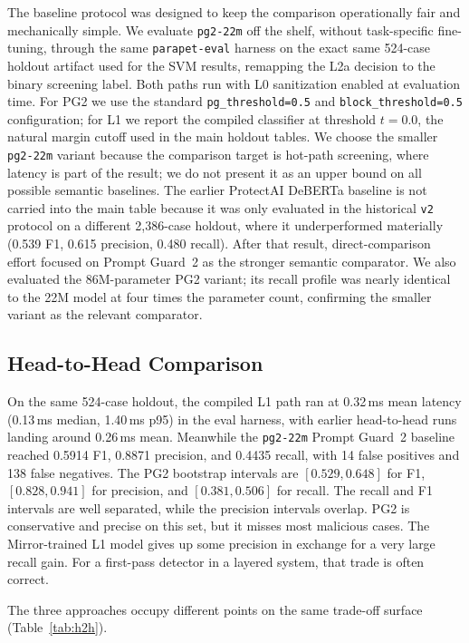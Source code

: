 \documentclass[11pt,a4paper]{article}
\begin{document}
The baseline protocol was designed to keep the comparison operationally
fair and mechanically simple. We evaluate \texttt{pg2-22m} off the
shelf, without task-specific fine-tuning, through the same
\texttt{parapet-eval} harness on the exact same 524-case holdout
artifact used for the SVM results, remapping the L2a decision to the
binary screening label. Both paths run with L0 sanitization enabled at
evaluation time. For PG2 we use the standard
\texttt{pg\_threshold=0.5} and \texttt{block\_threshold=0.5}
configuration; for L1 we report the compiled classifier at threshold
$t{=}0.0$, the natural margin cutoff used in the main holdout tables.
We choose the smaller \texttt{pg2-22m} variant because the comparison
target is hot-path screening, where latency is part of the result; we do
not present it as an upper bound on all possible semantic baselines. The
earlier ProtectAI DeBERTa baseline is not carried into the main table
because it was only evaluated in the historical \texttt{v2} protocol on
a different 2,386-case holdout, where it underperformed materially
(0.539 F1, 0.615 precision, 0.480 recall). After that result,
direct-comparison effort focused on Prompt Guard~2 as the stronger
semantic comparator. We also evaluated the 86M-parameter PG2 variant;
its recall profile was nearly identical to the 22M model at four times
the parameter count, confirming the smaller variant as the relevant
comparator.

\subsection{Head-to-Head Comparison}
\label{sec:h2h}

On the same 524-case holdout, the compiled L1 path ran at 0.32\,ms mean
latency (0.13\,ms median, 1.40\,ms p95) in the eval harness, with
earlier head-to-head runs landing around 0.26\,ms mean. Meanwhile the
\texttt{pg2-22m} Prompt Guard~2 baseline reached 0.5914 F1, 0.8871
precision, and 0.4435 recall, with 14 false positives and 138 false
negatives. The PG2 bootstrap intervals are $[0.529, 0.648]$ for F1,
$[0.828, 0.941]$ for precision, and $[0.381, 0.506]$ for recall. The
recall and F1 intervals are well separated, while the precision
intervals overlap. PG2 is conservative and precise on this set, but it
misses most malicious cases. The Mirror-trained L1 model gives up some
precision in exchange for a very large recall gain. For a first-pass
detector in a layered system, that trade is often correct.

The three approaches occupy different points on the same trade-off
surface (Table~\ref{tab:h2h}).
\end{document}
